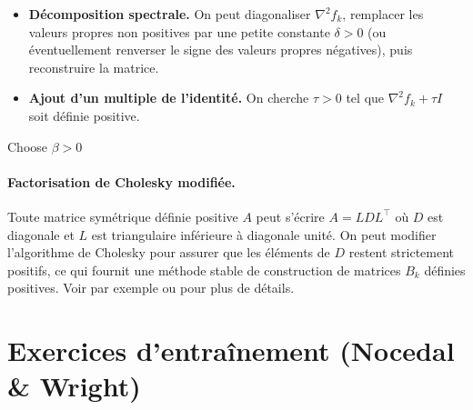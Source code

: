 \begin{itemize}
    \item \textbf{Décomposition spectrale.} On peut diagonaliser $\nabla^2 f_k$,
    remplacer les valeurs propres non positives par une petite constante $\delta>0$
    (ou éventuellement renverser le signe des valeurs propres négatives), puis
    reconstruire la matrice.
    \item \textbf{Ajout d’un multiple de l’identité.} On cherche $\tau>0$ tel que
    $\nabla^2 f_k + \tau I$ soit définie positive.
\end{itemize}

\begin{algorithm}[H]
\caption{Cholesky avec ajout d'un multiple de l'identité}
\label{alg:Cholesky-identity}
Choose $\beta > 0$\;
\end{algorithm}

\paragraph{Factorisation de Cholesky modifiée.}

Toute matrice symétrique définie positive $A$ peut s’écrire $A = LDL^\top$ où
$D$ est diagonale et $L$ est triangulaire inférieure à diagonale unité.
On peut modifier l’algorithme de Cholesky pour assurer que les éléments de $D$
restent strictement positifs, ce qui fournit une méthode stable de construction
de matrices $B_k$ définies positives. Voir par exemple \cite{gill2019practical}
ou \cite{more1982newton} pour plus de détails.

\section{Exercices d'entraînement (Nocedal \& Wright)}
\label{sec:2.exercises}

